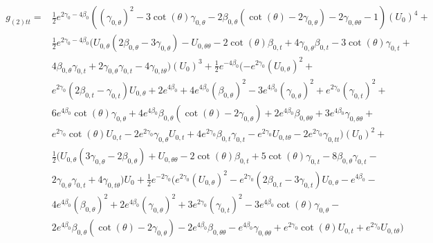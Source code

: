 \documentclass[a4paper,11pt]{article}
\numberwithin{equation}{section}
\begin{document}
\begin{subequations}

\begin{align}
\begin{split} \label{eq: g_2tt}
g_{(2) tt}=&\frac{1}{2} e^{2 \gamma_{0}-4 \beta_{0}} ((\gamma_{0, \theta})^2-3 \cot (\theta ) \gamma_{0, \theta}-2 \beta_{0, \theta} (\cot (\theta )-2 \gamma_{0, \theta})-2 \gamma_{0, \theta \theta}-1) (U_{0})^4+\\
&\frac{1}{2} e^{2 \gamma_{0}-4 \beta_{0}} (U_{0, \theta} (2 \beta_{0, \theta}-3 \gamma_{0, \theta})-U_{0, \theta \theta}-2 \cot (\theta ) \beta_{0, t}+4 \gamma_{0, \theta} \beta_{0, t}-3 \cot (\theta ) \gamma_{0, t}+\\
&4 \beta_{0, \theta} \gamma_{0, t}+2 \gamma_{0, \theta} \gamma_{0, t}-4 \gamma_{0, t \theta}) (U_{0})^3+\frac{1}{2} e^{-4 \beta_{0}} (-e^{2 \gamma_{0}} (U_{0, \theta})^2+\\
&e^{2 \gamma_{0}} (2 \beta_{0, t}-\gamma_{0, t}) U_{0, \theta}+2 e^{4 \beta_{0}}+4 e^{4 \beta_{0}} (\beta_{0, \theta})^2-3 e^{4 \beta_{0}} (\gamma_{0, \theta})^2+e^{2 \gamma_{0}} (\gamma_{0, t})^2+\\
&6 e^{4 \beta_{0}} \cot (\theta ) \gamma_{0, \theta}+4 e^{4 \beta_{0}} \beta_{0, \theta} (\cot (\theta )-2 \gamma_{0, \theta})+2 e^{4 \beta_{0}} \beta_{0, \theta \theta}+3 e^{4 \beta_{0}} \gamma_{0, \theta \theta}+\\
&e^{2 \gamma_{0}} \cot (\theta ) U_{0, t}-2 e^{2 \gamma_{0}} \gamma_{0, \theta} U_{0, t}+4 e^{2 \gamma_{0}} \beta_{0, t} \gamma_{0, t}-e^{2 \gamma_{0}} U_{0, t \theta}-2 e^{2 \gamma_{0}} \gamma_{0, t t}) (U_{0})^2+\\
&\frac{1}{2} (U_{0, \theta} (3 \gamma_{0, \theta}-2 \beta_{0, \theta})+U_{0, \theta \theta}-2 \cot (\theta ) \beta_{0, t}+5 \cot (\theta ) \gamma_{0, t}-8 \beta_{0, \theta} \gamma_{0, t}-\\
&2 \gamma_{0, \theta} \gamma_{0, t}+4 \gamma_{0, t \theta}) U_{0}+\frac{1}{2} e^{-2 \gamma_{0}} (e^{2 \gamma_{0}} (U_{0, \theta})^2-e^{2 \gamma_{0}} (2 \beta_{0, t}-3 \gamma_{0, t}) U_{0, \theta}-e^{4 \beta_{0}}-\\
&4 e^{4 \beta_{0}} (\beta_{0, \theta})^2+2 e^{4 \beta_{0}} (\gamma_{0, \theta})^2+3 e^{2 \gamma_{0}} (\gamma_{0, t})^2-3 e^{4 \beta_{0}} \cot (\theta ) \gamma_{0, \theta}-\\
&2 e^{4 \beta_{0}} \beta_{0, \theta} (\cot (\theta )-2 \gamma_{0, \theta})-2 e^{4 \beta_{0}} \beta_{0, \theta \theta}-e^{4 \beta_{0}} \gamma_{0, \theta \theta}+e^{2 \gamma_{0}} \cot (\theta ) U_{0, t}+e^{2 \gamma_{0}} U_{0, t \theta})
\end{split}
\end{align}


\end{subequations}
\end{document}
